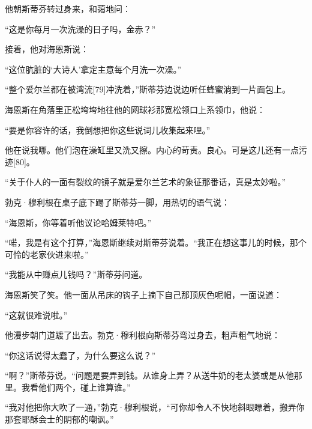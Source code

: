 \documentclass{article}
\begin{document}
他朝斯蒂芬转过身来，和蔼地问：



“这是你每月一次洗澡的日子吗，金赤？”



接着，他对海恩斯说：



“这位肮脏的‘大诗人’拿定主意每个月洗一次澡。”



“整个爱尔兰都在被湾流[79]冲洗着，”斯蒂芬边说边听任蜂蜜淌到一片面包上。



海恩斯在角落里正松垮垮地往他的网球衫那宽松领口上系领巾，他说：



“要是你容许的话，我倒想把你这些说词儿收集起来哩。”



他在说我哪。他们泡在澡缸里又洗又擦。内心的苛责。良心。可是这儿还有一点污迹[80]。



“关于仆人的一面有裂纹的镜子就是爱尔兰艺术的象征那番话，真是太妙啦。”



勃克·穆利根在桌子底下踢了斯蒂芬一脚，用热切的语气说：



“海恩斯，你等着听他议论哈姆莱特吧。”



“喏，我是有这个打算，”海恩斯继续对斯蒂芬说着。“我正在想这事儿的时候，那个可怜的老家伙进来啦。”



“我能从中赚点儿钱吗？”斯蒂芬问道。



海恩斯笑了笑。他一面从吊床的钩子上摘下自己那顶灰色呢帽，一面说道：



“这就很难说啦。”



他漫步朝门道踱了出去。勃克·穆利根向斯蒂芬弯过身去，粗声粗气地说：



“你这话说得太蠢了，为什么要这么说？”



“啊？”斯蒂芬说。“问题是要弄到钱。从谁身上弄？从送牛奶的老太婆或是从他那里。我看他们两个，碰上谁算谁。”



“我对他把你大吹了一通，”勃克·穆利根说，“可你却令人不快地斜眼瞟着，搬弄你那套耶酥会士的阴郁的嘲讽。”
\end{document}
